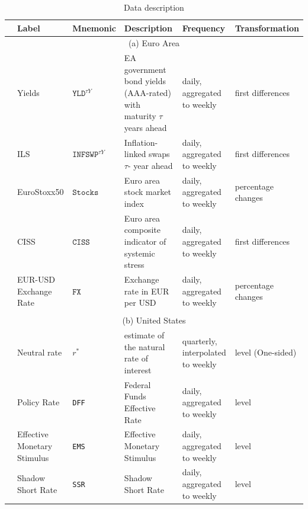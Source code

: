 


\begin{table}[!htbp]
{\tiny
\caption{Data description \label{tab:data}} 
\begin{tabular}{llllll}
\toprule
& \textbf{Label}  & \textbf{Mnemonic} & \textbf{Description}  & Frequency & \textbf{Transformation}   \\ 
\midrule
\multicolumn{6}{c}{(a) Euro Area}\\[0.5em]
& Yields & $\texttt{YLD}^{\tau Y}$ & EA government bond yields (AAA-rated)  with maturity $\tau$ years ahead & daily, aggregated to weekly & first differences\\
& ILS & $\texttt{INFSWP}^{\tau Y}$ & Inflation-linked swaps $\tau$- year ahead & daily, aggregated to weekly & first differences\\
& EuroStoxx50 & $\texttt{Stocks}$ & Euro area stock market index   & daily, aggregated to weekly & percentage changes \\
& CISS & $\texttt{CISS}$ & Euro area composite indicator of systemic stress \citep{kremer2012CISS} & daily, aggregated to weekly & first differences \\
& EUR-USD Exchange Rate & $\texttt{FX}$ & Exchange rate in EUR per USD & daily, aggregated to weekly &  percentage changes\\ \\
\midrule
 \multicolumn{6}{c}{(b) United States}\\[0.5em]
 & Neutral rate   & $r^{\ast}$ &  estimate of the natural rate of interest \citep{laubach2003measuring} &  quarterly, interpolated to weekly  & level  (One-sided) \\
& Policy Rate & \texttt{DFF} &  Federal Funds Effective Rate  &daily, aggregated to weekly &level \\
& Effective Monetary Stimulus & \texttt{EMS} &  Effective Monetary Stimulus \citep{krippner2016ems} &daily, aggregated to weekly &level\\
& Shadow Short Rate & \texttt{SSR} & Shadow Short Rate \rev{\citep{krippner2013ssr}} &daily, aggregated to weekly &level\\

\end{tabular}}
\end{table}
